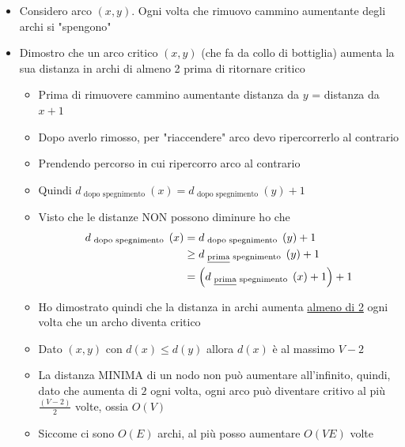 \begin{itemize}
	\item Considero arco $ \left(x,y\right) $. Ogni volta che rimuovo cammino aumentante degli archi si "spengono"
	\item Dimostro che un arco critico $ \left(x,y\right) $ (che fa da collo di bottiglia) aumenta la sua distanza in archi di almeno 2 prima di ritornare critico
	      \begin{itemize}
		      \item Prima di rimuovere cammino aumentante distanza da $ y $ = distanza da $ x + 1 $
		      \item Dopo averlo rimosso, per "riaccendere" arco devo ripercorrerlo al contrario
		      \item Prendendo percorso in cui ripercorro arco al contrario
		      \item Quindi $ d_{\text{ dopo spegnimento }}\left(x\right) =  d_{\text{ dopo spegnimento }}\left(y\right) + 1 $
		      \item Visto che le distanze NON possono diminure ho che
		            \begin{align*}
			            d_{\text{ dopo spegnimento }}\left(x\right) & =  d_{\text{ dopo spegnimento }}\left(y\right) + 1                              \\
			                                                        & \ge d_{\text{ \underline{prima} spegnimento }}\left(y\right) + 1                \\
			                                                        & = \left(d_{\text{ \underline{prima} spegnimento }}\left(x\right) + 1\right) + 1
		            \end{align*}
		      \item Ho dimostrato quindi che la distanza in archi aumenta \underline{almeno di 2} ogni volta che un archo diventa critico
		      \item Dato $ \left(x,y\right) $ con $ d\left(x\right) \le d\left(y\right) $ allora $ d\left(x\right) $ è al massimo $ V - 2 $
		      \item La distanza MINIMA di un nodo non può aumentare all'infinito, quindi, dato che aumenta di $ 2 $ ogni volta, ogni arco può diventare critivo al più $ \frac{\left(V-2\right)}{2} $ volte, ossia $ O\left(V\right) $
		      \item Siccome ci sono $ O\left(E\right) $ archi, al più posso aumentare $ O\left(VE\right) $ volte
	      \end{itemize}
\end{itemize}
